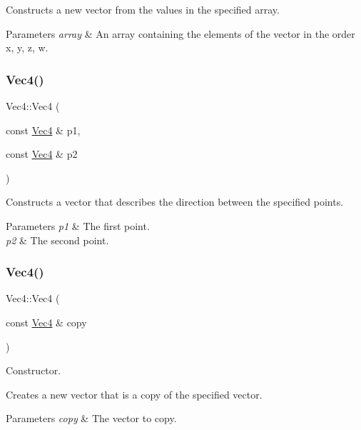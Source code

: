 Constructs a new vector from the values in the specified array.


\begin{DoxyParams}{Parameters}
{\em array} & An array containing the elements of the vector in the order x, y, z, w. \\
\hline
\end{DoxyParams}
\mbox{\label{classVec4_a91984373f7c3e83afcadf30ec5dad52a}} 
\subsubsection{\texorpdfstring{Vec4()}{Vec4()}\hspace{0.1cm}{\footnotesize\ttfamily [4/10]}}
{\footnotesize\ttfamily Vec4\+::\+Vec4 (\begin{DoxyParamCaption}\item[{const \hyperlink{classVec4}{Vec4} \&}]{p1,  }\item[{const \hyperlink{classVec4}{Vec4} \&}]{p2 }\end{DoxyParamCaption})}

Constructs a vector that describes the direction between the specified points.


\begin{DoxyParams}{Parameters}
{\em p1} & The first point. \\
\hline
{\em p2} & The second point. \\
\hline
\end{DoxyParams}
\mbox{\label{classVec4_acf7b803835459315b73f0cab3b5d392c}} 
\subsubsection{\texorpdfstring{Vec4()}{Vec4()}\hspace{0.1cm}{\footnotesize\ttfamily [5/10]}}
{\footnotesize\ttfamily Vec4\+::\+Vec4 (\begin{DoxyParamCaption}\item[{const \hyperlink{classVec4}{Vec4} \&}]{copy }\end{DoxyParamCaption})}

Constructor.

Creates a new vector that is a copy of the specified vector.


\begin{DoxyParams}{Parameters}
{\em copy} & The vector to copy. \\
\hline
\end{DoxyParams}
\mbox{\label{classVec4_a3c8428ad7cfa4fe9e82ea571ab0ad119}} 
